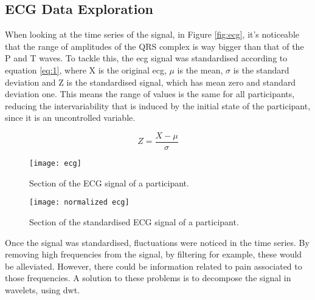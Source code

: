 

\subsection{ECG Data Exploration}
When looking at the time series of the signal, in Figure \ref{fig:ecg}, it's noticeable that the range of amplitudes of the QRS complex is way bigger than that of the P and T waves.
To tackle this, the \ac{ecg} signal was standardised according to equation \ref{eq:1}, where X is the original \ac{ecg}, $\mu$ is the mean, $\sigma$ is the standard deviation and Z is the standardised signal, which has mean zero and standard deviation one. 
This means the range of values is the same for all participants, reducing the intervariability that is induced by the initial state of the participant, since it is an uncontrolled variable.

\begin{equation} \label{eq:1}
Z = \frac{X-\mu}{\sigma}
\end{equation}


\begin{figure}[htbp]
    \centering
    \begin{minipage}{0.45\textwidth}
        \centering
        \texttt{[image: ecg]}
        \caption{Section of the ECG signal of a participant.}
        \label{fig:ecg}
    \end{minipage}
    \hfill
    \begin{minipage}{0.45\textwidth}
        \centering
        \texttt{[image: normalized ecg]}
        \caption{Section of the standardised ECG signal of a participant.}
        \label{fig:normalised_ecg}
    \end{minipage}
\end{figure}

Once the signal was standardised, fluctuations were noticed in the time series.
By removing high frequencies from the signal, by filtering for example, these would be alleviated.
However, there could be information related to pain associated to those frequencies.
A solution to these problems is to decompose the signal in wavelets, using \ac{dwt}. 

